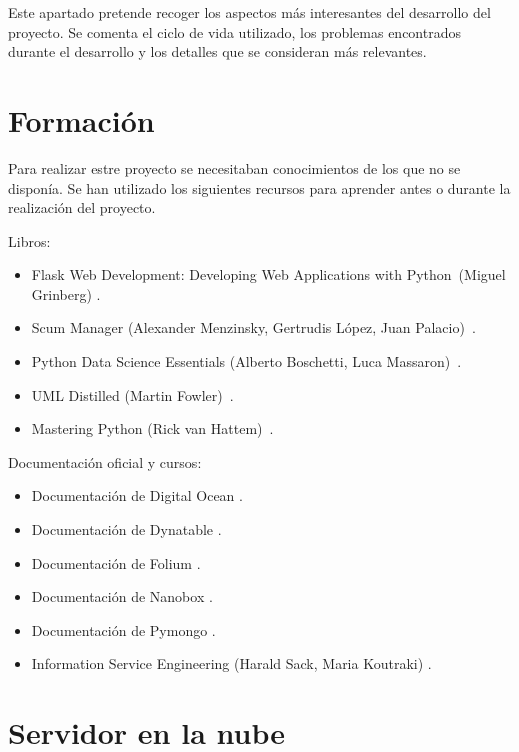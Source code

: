 
Este apartado pretende recoger los aspectos más interesantes del desarrollo del proyecto. Se comenta el ciclo de vida utilizado, los problemas encontrados durante el desarrollo y los detalles que se consideran más relevantes.

\section{Formación}

Para realizar estre proyecto se necesitaban conocimientos de los que no se disponía. Se han utilizado los siguientes recursos para aprender antes o durante la realización del proyecto.

Libros:

\begin{itemize}
	\item Flask Web Development: Developing Web Applications with Python~(Miguel Grinberg) \cite{book:flask}.
	\item Scum Manager (Alexander Menzinsky, Gertrudis López, Juan Palacio)~\cite{book:scrum}.
	\item Python Data Science Essentials (Alberto Boschetti, Luca Massaron)~\cite{book:pythondatascience}.
	\item UML Distilled (Martin Fowler)~\cite{book:umldistilled}.
	\item Mastering Python (Rick van Hattem)~\cite{book:masteringpython}.
\end{itemize}

Documentación oficial y cursos:

\begin{itemize}
	\item Documentación de Digital Ocean \cite{docs:digitalocean}.
	\item Documentación de Dynatable \cite{docs:dynatable}.
	\item Documentación de Folium \cite{docs:folium}.
	\item Documentación de Nanobox \cite{docs:nanobox}.
	\item Documentación de Pymongo \cite{docs:pymongo}.
	\item Information Service Engineering (Harald Sack, Maria Koutraki) \cite{misc:informationserviceengineering}.
\end{itemize}

\section{Servidor en la nube}

